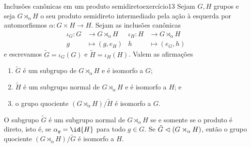 \begin{proposition}{Inclusões canônicas em um produto semidireto}{exercício13}
    Sejam \(G, H\) grupos e seja \(G \rtimes_{\alpha} H\) o seu produto semidireto intermediado pela ação à esquerda por automorfismos \(\alpha : G \times H \to H\). Sejam as inclusões canônicas
    \begin{align*}
        \iota_G : G &\to G \rtimes_{\alpha} H &
        \iota_H : H &\to G \rtimes_{\alpha} H\\
                  g &\mapsto (g, e_H)&
                  h &\mapsto (e_G, h)
    \end{align*}
    e escrevamos \(\tilde{G} = \iota_G(G)\) e \(\tilde{H} = \iota_H(H)\). Valem as afirmações
    \begin{enumerate}[label=(\alph*)]
        \item \(\tilde{G}\) é um subgrupo de \(G \rtimes_{\alpha} H\) e é isomorfo a \(G\);
        \item \(\tilde{H}\) é um subgrupo normal de \(G \rtimes_{\alpha} H\) e é isomorfo a \(H\); e
        \item o grupo quociente \((G\rtimes_{\alpha}H)/\tilde{H}\) é isomorfo a \(G\).
    \end{enumerate}
    O subgrupo \(\tilde{G}\) é um subgrupo normal de \(G \rtimes_{\alpha} H\) se e somente se o produto é direto, isto é, se \(\alpha_{g} = \id{H}\) para todo \(g \in G\). Se \(\tilde{G} \vartriangleleft (G \rtimes_{\alpha} H)\), então o grupo quociente \((G \rtimes_{\alpha} H)/\tilde{G}\) é isomorfo a \(H\).
\end{proposition}
